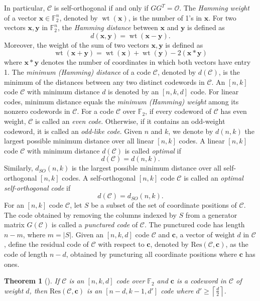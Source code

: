 \documentclass{article}
\newtheorem{theorem}{Theorem}
\newcommand{\wt}{\operatorname{wt}}
\begin{document}
In particular, $\mathcal{C}$ is self-orthogonal if and only if $GG^{T}=\mathcal{O}$.
The \textit{Hamming weight} of a vector $\mathbf{x} \in \mathbb{F}_2^n$, denoted by $\wt(\mathbf{x})$, is the number of 1's in $\mathbf{x}$. For two vectors $\mathbf{x}, \mathbf{y}$ in $\mathbb{F}_2^n$, the \textit{Hamming distance} between $\mathbf{x}$ and $\mathbf{y}$ is defined as
\[
d(\mathbf{x}, \mathbf{y})=\wt(\mathbf{x} - \mathbf{y}).
\]
Moreover, the weight of the sum of two vectors $\mathbf{x}, \mathbf{y}$ is defined as \[
\wt(\mathbf{x}+ \mathbf{y})=\wt(\mathbf{x})+\wt(\mathbf{y})-2(\mathbf{x} * \mathbf{y})
\] where $\mathbf{x}*\mathbf{y}$ denotes the number of coordinates in which both vectors have entry 1.
The \textit{minimum (Hamming) distance} of a code $\mathcal{C}$, denoted by $d(\mathcal{C})$, is the minimum of the distances between any two distinct codewords in $\mathcal{C}$. An $[n,k]$ code $\mathcal{C}$ with minimum distance $d$ is denoted by an $[n,k,d]$ code. For linear codes, minimum distance equals the \textit{minimum (Hamming) weight} among its nonzero codewords in $\mathcal{C}$. For a code $\mathcal{C}$ over $\mathbb{F}_2$, if every codeword of $\mathcal{C}$ has even weight, $\mathcal{C}$ is called an \textit{even code}. Otherwise, if it contains an odd-weight codeword, it is called an \textit{odd-like code}.
Given $n$ and $k$, we denote by $d(n, k)$ the largest possible minimum distance over all linear $[n, k]$ codes. A linear $[n,k]$ code $\mathcal{C}$ with minimum distance $d(\mathcal{C})$ is called \textit{optimal} if
\[
d(\mathcal{C})=d(n,k).
\]
Similarly, $d_{SO}(n, k)$ is the largest possible minimum distance over all self-orthogonal $[n, k]$ codes. A self-orthogonal $[n,k]$ code $\mathcal{C}$ is called an \textit{optimal self-orthogonal code} if
\[
d(\mathcal{C}) = d_{SO}(n, k).
\]
For an $[n,k]$ code $\mathcal{C}$, let $S$ be a subset of the set of coordinate positions of $\mathcal{C}$. The code obtained by removing the columns indexed by $S$ from a generator matrix $G(\mathcal{C})$ is called a \textit{punctured code} of $\mathcal{C}$. The punctured code has length $n-m$, where $m = |S|$.
Given an $[n, k, d]$ code $\mathcal{C}$ and $\mathbf{c}$, a vector of weight $d$ in $\mathcal{C}$, define the residual code of $\mathcal{C}$ with respect to $\mathbf{c}$, denoted by $\mathrm{Res}(\mathcal{C}, \mathbf{c})$, as the code of length $n-d$, obtained by puncturing all coordinate positions where $\mathbf{c}$ has ones.
\begin{theorem}[{\cite{Introduction}}]
If $\mathcal{C}$ is an $[n, k, d]$ code over $\mathbb{F}_2$ and $\mathbf{c}$ is a codeword in $\mathcal{C}$ of weight $d$, then $\mathrm{Res}(\mathcal{C}, \mathbf{c})$ is an $[n-d, k-1, d']$ code where $\displaystyle d' \geq \left\lceil\frac{d}{2}\right\rceil$.
\end{theorem}
\end{document}
